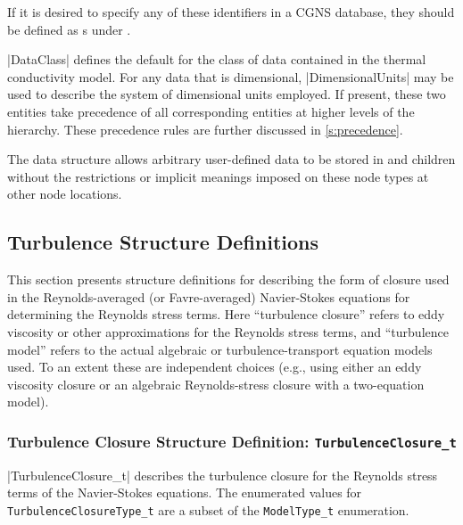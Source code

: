 If it is desired to specify any of these identifiers in a CGNS
database, they should be defined as s under
.

|DataClass| defines the default for the class of data contained in the
thermal conductivity model.
For any data that is dimensional, |DimensionalUnits| may be used to
describe the system of dimensional units employed.
If present, these two entities take precedence of all corresponding
entities at higher levels of the hierarchy.
These precedence rules are further discussed in \autoref{s:precedence}.

The  data structure allows arbitrary
user-defined data to be stored in  and
 children without the restrictions or implicit
meanings imposed on these node types at other node locations.

\subsection{Turbulence Structure Definitions}

This section presents structure definitions for describing the form of
closure used in the Reynolds-averaged (or Favre-averaged) Navier-Stokes
equations for determining the Reynolds stress terms.  Here ``turbulence
closure'' refers to eddy viscosity or other approximations for the
Reynolds stress terms, and ``turbulence model'' refers to the actual
algebraic or turbulence-transport equation models used.  To an extent
these are independent choices (e.g., using either an eddy viscosity
closure or an algebraic Reynolds-stress closure with a two-equation
model).

\subsubsection{Turbulence Closure Structure Definition: \texttt{TurbulenceClosure\_t}}

|TurbulenceClosure_t| describes the turbulence closure for the Reynolds
stress terms of the Navier-Stokes equations.
The enumerated values for \texttt{TurbulenceClosureType\_t} are a subset of the
\texttt{ModelType\_t} enumeration.


